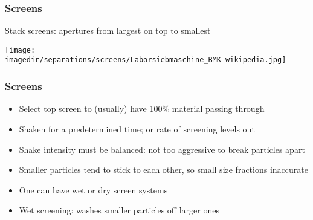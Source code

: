 \begin{frame}\frametitle{Screens}
	Stack screens: apertures from largest on top to smallest
	\begin{center}
		\texttt{[image: \\imagedir/separations/screens/Laborsiebmaschine\_BMK-wikipedia.jpg]}
	\end{center}
\end{frame}

\begin{frame}\frametitle{Screens}
	\begin{itemize}
		\item	Select top screen to (usually) have 100\% material passing through
		\item	Shaken for a predetermined time; or rate of screening levels out
		\item	Shake intensity must be balanced: not too aggressive to break particles apart
		\item	Smaller particles tend to stick to each other, so small size fractions inaccurate
		\item	One can have wet or dry screen systems
		\item	Wet screening: washes smaller particles off larger ones
	\end{itemize}
\end{frame}


